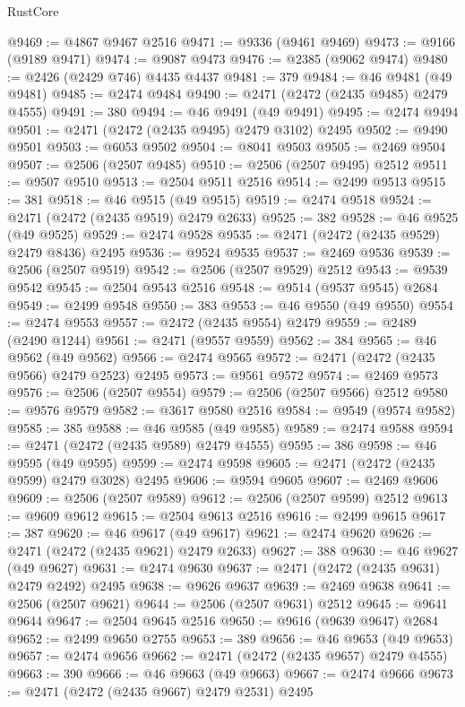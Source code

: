 \begin{lexlean}{RustCore}
\begin{coremodule}
@9469 := @4867 @9467 @2516
@9471 := @9336 (@9461 @9469)
@9473 := @9166 (@9189 @9471)
@9474 := @9087 @9473
@9476 := @2385 (@9062 @9474)
@9480 := @2426 (@2429 @746) @4435 @4437
@9481 := 379
@9484 := @46 @9481 (@49 @9481)
@9485 := @2474 @9484
@9490 := @2471 (@2472 (@2435 @9485) @2479 @4555)
@9491 := 380
@9494 := @46 @9491 (@49 @9491)
@9495 := @2474 @9494
@9501 := @2471 (@2472 (@2435 @9495) @2479 @3102) @2495
@9502 := @9490 @9501
@9503 := @6053 @9502
@9504 := @8041 @9503
@9505 := @2469 @9504
@9507 := @2506 (@2507 @9485)
@9510 := @2506 (@2507 @9495) @2512
@9511 := @9507 @9510
@9513 := @2504 @9511 @2516
@9514 := @2499 @9513
@9515 := 381
@9518 := @46 @9515 (@49 @9515)
@9519 := @2474 @9518
@9524 := @2471 (@2472 (@2435 @9519) @2479 @2633)
@9525 := 382
@9528 := @46 @9525 (@49 @9525)
@9529 := @2474 @9528
@9535 := @2471 (@2472 (@2435 @9529) @2479 @8436) @2495
@9536 := @9524 @9535
@9537 := @2469 @9536
@9539 := @2506 (@2507 @9519)
@9542 := @2506 (@2507 @9529) @2512
@9543 := @9539 @9542
@9545 := @2504 @9543 @2516
@9548 := @9514 (@9537 @9545) @2684
@9549 := @2499 @9548
@9550 := 383
@9553 := @46 @9550 (@49 @9550)
@9554 := @2474 @9553
@9557 := @2472 (@2435 @9554) @2479
@9559 := @2489 (@2490 @1244)
@9561 := @2471 (@9557 @9559)
@9562 := 384
@9565 := @46 @9562 (@49 @9562)
@9566 := @2474 @9565
@9572 := @2471 (@2472 (@2435 @9566) @2479 @2523) @2495
@9573 := @9561 @9572
@9574 := @2469 @9573
@9576 := @2506 (@2507 @9554)
@9579 := @2506 (@2507 @9566) @2512
@9580 := @9576 @9579
@9582 := @3617 @9580 @2516
@9584 := @9549 (@9574 @9582)
@9585 := 385
@9588 := @46 @9585 (@49 @9585)
@9589 := @2474 @9588
@9594 := @2471 (@2472 (@2435 @9589) @2479 @4555)
@9595 := 386
@9598 := @46 @9595 (@49 @9595)
@9599 := @2474 @9598
@9605 := @2471 (@2472 (@2435 @9599) @2479 @3028) @2495
@9606 := @9594 @9605
@9607 := @2469 @9606
@9609 := @2506 (@2507 @9589)
@9612 := @2506 (@2507 @9599) @2512
@9613 := @9609 @9612
@9615 := @2504 @9613 @2516
@9616 := @2499 @9615
@9617 := 387
@9620 := @46 @9617 (@49 @9617)
@9621 := @2474 @9620
@9626 := @2471 (@2472 (@2435 @9621) @2479 @2633)
@9627 := 388
@9630 := @46 @9627 (@49 @9627)
@9631 := @2474 @9630
@9637 := @2471 (@2472 (@2435 @9631) @2479 @2492) @2495
@9638 := @9626 @9637
@9639 := @2469 @9638
@9641 := @2506 (@2507 @9621)
@9644 := @2506 (@2507 @9631) @2512
@9645 := @9641 @9644
@9647 := @2504 @9645 @2516
@9650 := @9616 (@9639 @9647) @2684
@9652 := @2499 @9650 @2755
@9653 := 389
@9656 := @46 @9653 (@49 @9653)
@9657 := @2474 @9656
@9662 := @2471 (@2472 (@2435 @9657) @2479 @4555)
@9663 := 390
@9666 := @46 @9663 (@49 @9663)
@9667 := @2474 @9666
@9673 := @2471 (@2472 (@2435 @9667) @2479 @2531) @2495

\end{coremodule}
\end{lexlean}
